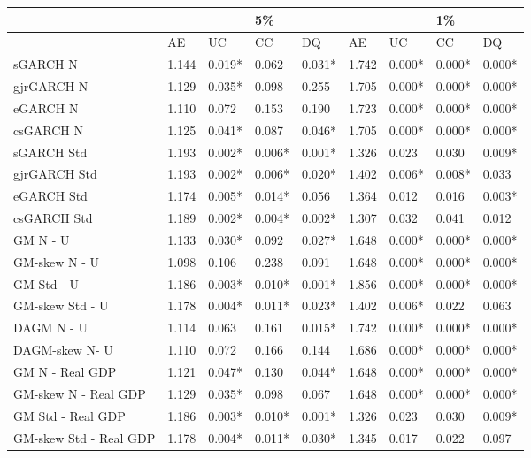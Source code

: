 \documentclass{article}
\begin{document}


\begin{table}[ht] 
\centering
\begin{tabular}{|l|llll|llll|}
 \hline
  &  &  & 5\% &  &   &  & 1\%&\\
\hline
 & AE & UC & CC & DQ & AE & UC & CC & DQ\\ 
  \hline
sGARCH N & 1.144 & 0.019* & 0.062 & 0.031* & 1.742 & 0.000* & 0.000* & 0.000*\\ 
  gjrGARCH N & 1.129 & 0.035* & 0.098 & 0.255 & 1.705 & 0.000*& 0.000* & 0.000*\\ 
  eGARCH N & 1.110 & 0.072 & 0.153 & 0.190 & 1.723 & 0.000* & 0.000* & 0.000*\\ 
  csGARCH N & 1.125 & 0.041* & 0.087 & 0.046* & 1.705 & 0.000* & 0.000* & 0.000* \\ 
  sGARCH Std & 1.193 & 0.002* & 0.006* & 0.001* & 1.326 & 0.023 & 0.030 & 0.009*\\ 
  gjrGARCH Std & 1.193 & 0.002* & 0.006* & 0.020* & 1.402 & 0.006* & 0.008* & 0.033\\ 
  eGARCH Std & 1.174 & 0.005* & 0.014* & 0.056 & 1.364 & 0.012 & 0.016 & 0.003*\\ 
  csGARCH Std & 1.189 & 0.002* & 0.004* & 0.002* & 1.307 & 0.032 & 0.041 & 0.012\\ 
  GM N - U & 1.133 & 0.030* & 0.092 & 0.027* & 1.648 & 0.000* & 0.000* & 0.000*\\ 
  GM-skew N - U & 1.098 & 0.106 & 0.238 & 0.091 & 1.648 & 0.000* & 0.000* & 0.000* \\ 
  GM Std - U & 1.186 & 0.003* & 0.010* & 0.001* & 1.856 & 0.000* & 0.000* & 0.000* \\ 
  GM-skew Std - U & 1.178 & 0.004* & 0.011* & 0.023* & 1.402 & 0.006* & 0.022 & 0.063 \\ 
  DAGM N - U & 1.114 & 0.063 & 0.161 & 0.015* & 1.742 & 0.000* & 0.000* & 0.000*\\ 
  DAGM-skew  N- U & 1.110 & 0.072 & 0.166 & 0.144 & 1.686 & 0.000* & 0.000* & 0.000*\\ 
  GM N - Real GDP & 1.121 & 0.047* & 0.130 & 0.044* &  1.648 & 0.000* & 0.000* & 0.000*\\ 
  GM-skew N - Real GDP & 1.129 & 0.035* & 0.098 & 0.067 &  1.648 & 0.000* & 0.000* & 0.000*\\ 
  GM Std - Real GDP & 1.186 & 0.003* & 0.010* & 0.001* & 1.326 & 0.023 & 0.030 & 0.009* \\ 
  GM-skew Std - Real GDP & 1.178 & 0.004* & 0.011* & 0.030* & 1.345 & 0.017 & 0.022 & 0.097\\ 

\end{tabular}
\end{table}
\end{document}
